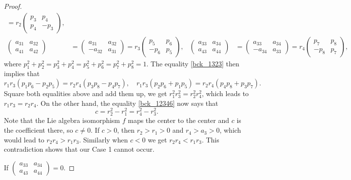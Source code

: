 \documentclass[10pt,a4paper]{amsart}
\begin{document}
\begin{proof}
\begin{align*}
=r_2 \begin{pmatrix} p_3 & p_4 \\ p_4 & -p_3 \end{pmatrix}, \\
\begin{pmatrix} a_{31} & a_{32} \\ a_{41} & a_{42} \end{pmatrix} &= \begin{pmatrix} a_{31} & a_{32} \\ -a_{32} & a_{31} \end{pmatrix}
=r_3 \begin{pmatrix} p_5 & p_6 \\ -p_6 & p_5 \end{pmatrix}, &
\begin{pmatrix} a_{33} & a_{34} \\ a_{43} & a_{44} \end{pmatrix} &= \begin{pmatrix} a_{33} & a_{34} \\ -a_{34} & a_{33} \end{pmatrix}
=r_4 \begin{pmatrix} p_7 & p_8 \\ -p_8 & p_7 \end{pmatrix},
\end{align*}
where $p_1^2+p_2^2=p_3^2+p_4^2=p_5^2+p_6^2=p_7^2+p_8^2 =1$. The equality \eqref{bck_1323} then implies that
\[r_1 r_3(p_1 p_6 - p_2 p_5)=r_2 r_4(p_3 p_8 - p_4 p_7 ),\quad r_1 r_3(p_2 p_6 + p_1 p_5)=r_2 r_4(p_4 p_8 + p_3 p_7 ). \]
Square both equalities above and add them up,  we get $r^2_1 r^2_3 = r^2_2 r^2_4$,
which leads to $r_1 r_3 = r_2 r_4$. On the other hand, the equality \eqref{bck_12346} now says that
\[ c=r_2^2 -r_1^2 = r_4^2 -r_3^2.\]
Note that the Lie algebra isomorphism $f$ maps the center to the center and $c$ is the coefficient there, so $c\neq 0$. If $c>0$, then $r_2>r_1>0$ and $r_4>a_3>0$, which would lead to $r_2r_4>r_1r_3$. Similarly when $c<0$ we get $r_2r_4<r_1r_3$. This contradiction shows that our Case 1 cannot occur.

\vspace{0.2cm}

 If $\begin{pmatrix}a_{33} & a_{34} \\ a_{43} & a_{44} \end{pmatrix} = 0$.


\end{proof}
\end{document}
